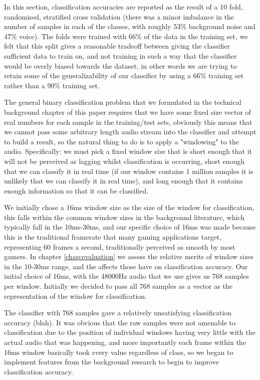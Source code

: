 \documentclass[ %
                    author={Sam Phippen},
                supervisor={Dr. Rafal Bogacz},
                     title={Real time voice activity detectors in noisy personal computing environments},
                  subtitle={},
                    degree={MEng},
                      year={2012} ]{thesis}
\begin{document}
In this section, classification accuracies are reported as the result of a 10
fold, randomised, stratified cross validation (there was a minor imbalance in
the number of samples in each of the classes, with roughly 53\% background
noise and 47\% voice). The folds were trained with 66\% of the data in the
training set, we felt that this split gives a reasonable tradeoff between
giving the classifier sufficient data to train on, and not training in such a
way that the classifier would be overly biased towards the dataset, in other
words we are trying to retain some of the generalizability of our classifier by
using a 66\% training set rather than a 90\% training set.

The general binary classification problem that we formulated in the technical
background chapter of this paper requires that we have some fixed size vector
of real numbers for each sample in the training/test sets, obviously this means
that we cannot pass some arbitrary length audio stream into the classifier and
attempt to build a result, so the natural thing to do is to apply a "windowing"
to the audio. Specifically: we must pick a fixed window size that is short
enough that it will not be perceived as lagging whilst classification is
occurring, short enough that we can classify it in real time (if our window
contains 1 million samples it is unlikely that we can classify it in real
time), and long enough that it contains enough information so that it can be
classified.

We initially chose a 16ms window size as the size of the window for
classification, this falls within the common window sizes in the background
literature, which typically fall in the 10ms-30ms, and our specific choice of
16ms was made because this is the traditional framerate that many gaming
applications target, representing 60 frames a second, traditionally perceived
as smooth by most gamers. In chapter \ref{chap:evaluation} we assess the
relative merits of window sizes in the 10-30ms range, and the affects those
have on classification accuracy. Our initial choice of 16ms, with the 48000Hz
audio that we use gives us 768 samples per window. Initially we decided to pass
all 768 samples as a vector as the representation of the window for
classification.

The classifier with 768 samples gave a relatively unsatisfying classification
accuracy (blah). It was obvious that the raw samples were not amenable to
classification due to the position of individual windows having very little
with the actual audio that was happening, and more importantly each frame
within the 16ms window basically took every value regardless of class, so we
began to implement features from the background research to begin to improve
classification accuracy.
\end{document}
